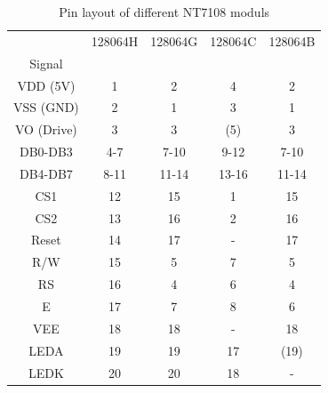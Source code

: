 \begin{table}[H]
  \begin{center}
    \begin{tabular}{| c || c | c | c | c |}
    \hline
           & 128064H  &  128064G  & 128064C  & 128064B \\
    Signal &         &          &         &         \\
    \hline
    \hline
  VDD (5V) &   1     &  2       &   4     & 2       \\
    \hline
  VSS (GND) &   2     &  1       &   3     & 1       \\
    \hline
 VO (Drive) &   3     &  3       &  (5)    & 3       \\
    \hline
  DB0-DB3   &   4-7   &  7-10    &   9-12  & 7-10    \\
    \hline
  DB4-DB7   &   8-11  &  11-14   &   13-16 & 11-14   \\
    \hline
  CS1       &   12    &  15      &   1     & 15      \\
  CS2       &   13    &  16      &   2     & 16      \\
    \hline
  Reset     &   14    &  17      &   -     & 17      \\
    \hline
  R/W       &   15    &  5       &   7     & 5       \\
    \hline
  RS        &   16    &  4       &   6     & 4       \\
    \hline
  E         &   17    &  7       &   8     & 6       \\
    \hline
  VEE       &   18    &  18      &   -     & 18      \\
    \hline
  LEDA      &   19    &  19      &   17    & (19)      \\
  LEDK      &   20    &  20      &   18    & -      \\
    \hline
    \end{tabular}
  \end{center}
  \caption{Pin layout of different NT7108 moduls}
  \label{tab:NT7108types}
\end{table}

